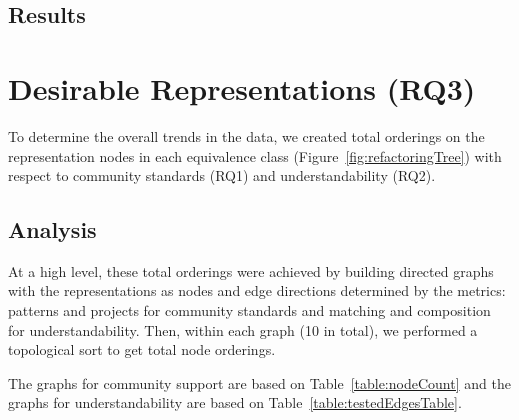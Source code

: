 


\subsection{Results}





\section{Desirable Representations (RQ3)}
To determine the overall trends in the data, we created total orderings on the representation nodes in each equivalence class (Figure~\ref{fig:refactoringTree})  with respect to community standards (RQ1)  and understandability (RQ2).

\subsection{Analysis}
At a high level, these total orderings were achieved by building directed graphs with the representations as nodes and edge directions determined by the metrics: patterns and projects for community standards and matching and composition for understandability. Then, within each graph (10 in total), we performed a topological sort to get total node orderings.

The graphs for community support are based on Table~\ref{table:nodeCount} and the graphs for understandability are based on Table~\ref{table:testedEdgesTable}.

